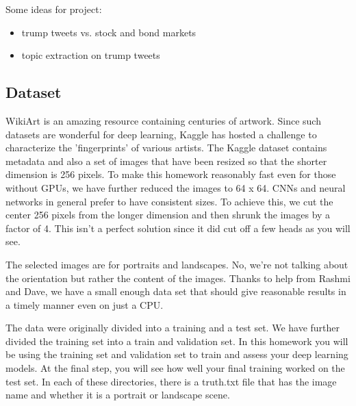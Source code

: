 \documentclass[11pt]{article}
\providecommand{\tightlist}{%
      \setlength{\itemsep}{0pt}\setlength{\parskip}{0pt}}
\begin{document}
    Some ideas for project:

\begin{itemize}
\tightlist
\item
  trump tweets vs. stock and bond markets
\item
  topic extraction on trump tweets
\end{itemize}

    \subsection{Dataset}\label{dataset}

WikiArt is an amazing resource containing centuries of artwork. Since
such datasets are wonderful for deep learning, Kaggle has hosted a
challenge to characterize the 'fingerprints' of various artists. The
Kaggle dataset contains metadata and also a set of images that have been
resized so that the shorter dimension is 256 pixels. To make this
homework reasonably fast even for those without GPUs, we have further
reduced the images to 64 x 64. CNNs and neural networks in general
prefer to have consistent sizes. To achieve this, we cut the center 256
pixels from the longer dimension and then shrunk the images by a factor
of 4. This isn't a perfect solution since it did cut off a few heads as
you will see.

The selected images are for portraits and landscapes. No, we're not
talking about the orientation but rather the content of the images.
Thanks to help from Rashmi and Dave, we have a small enough data set
that should give reasonable results in a timely manner even on just a
CPU.

The data were originally divided into a training and a test set. We have
further divided the training set into a train and validation set. In
this homework you will be using the training set and validation set to
train and assess your deep learning models. At the final step, you will
see how well your final training worked on the test set. In each of
these directories, there is a truth.txt file that has the image name and
whether it is a portrait or landscape scene.
\end{document}
